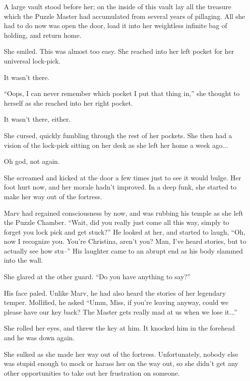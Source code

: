 \documentclass[showtrims,b6paper,draft,10pt]{memoir}
\begin{document}
A large vault stood before her;  on the inside of this vault lay all the treasure which the Puzzle Master had accumulated from several years of pillaging.  All she had to do now was open the door, load it into her weightless infinite bag of holding, and return home.

She smiled.  This was almost too easy.  She reached into her left pocket for her universal lock-pick.

It wasn’t there.

``Oops, I can never remember which pocket I put that thing in,'' she thought to herself as she reached into her right pocket.

It wasn’t there, either.

She cursed, quickly fumbling through the rest of her pockets.  She then had a vision of the lock-pick sitting on her desk as she left her home a week ago...

Oh god, not again.

She screamed and kicked at the door a few times just to see it would bulge.  Her foot hurt now, and her morale hadn’t improved.  In a deep funk, she started to make her way out of the fortress.

Marv had regained consciousness by now, and was rubbing his temple as she left the Puzzle Chamber.  ``Wait, did you really just come all this way, simply to forget you lock pick and get stuck?''  He looked at her, and started to laugh, ``Oh, now I recognize you.  You’re Christina, aren’t you?  Man, I’ve heard stories, but to actually see how stu--'' His laughter came to an abrupt end as his body slammed into the wall.

She glared at the other guard.  “Do you have anything to say?”

His face paled.  Unlike Marv, he had also heard the stories of her legendary temper.  Mollified, he asked  ``Umm, Miss, if you’re leaving anyway, could we please have our key back?  The Master gets really mad at us when we lose it...''

She rolled her eyes, and threw the key at him.  It knocked him in the forehead and he was down again.

\timeskip
She sulked as she made her way out of the fortress.  Unfortunately, nobody else was stupid enough to mock or harass her on the way out, so she didn’t get any other opportunities to take out her frustration on someone.
\end{document}
